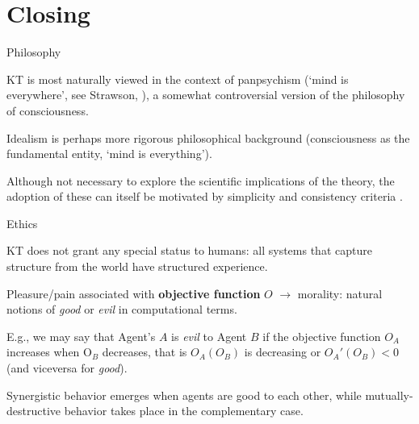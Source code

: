 \section{Closing}



\begin{frame}[label=ladila]{Philosophy}

KT is most naturally viewed in the context of panpsychism (`mind is everywhere', see Strawson, \cite{Goff:2019aa}), a  somewhat controversial version of the philosophy of consciousness.  \vfill

Idealism is  perhaps more rigorous philosophical background (consciousness as the fundamental entity, `mind is everything'). \vfill

 Although not necessary to explore the scientific implications of the theory, the adoption of these can itself be  motivated by simplicity and consistency criteria \citep{Symes2022-ri}.
 
\end{frame}



\begin{frame}[label=ladila]{Ethics}

KT does not grant any special status to humans: all systems that capture structure from the world have structured experience.  \vfill

Pleasure/pain associated with  {\bf objective function} $O$ $\rightarrow$ morality:  natural notions of {\em good} or {\em evil} in computational terms. \vfill

E.g., we may say that Agent's $A$ is {\em evil} to Agent $B$ if the objective function   $O_A$ increases when O$_B$ decreases, that is $O_A(O_B)$ is decreasing or  $O_A'(O_B) <0$ (and viceversa for {\em good}).
 \vfill
 

Synergistic behavior emerges when agents are good to each other, while mutually-destructive behavior takes place in the complementary case.  
 
\end{frame}


